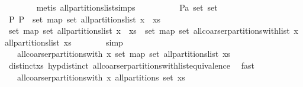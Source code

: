 \begin{isabellebody}
\ \ \ \ \ \ \isamarkupfalse%
\ {\isacharparenleft}metis\ all{\isacharunderscore}partitions{\isacharunderscore}list{\isachardot}simps{\isacharparenleft}{}{\isacharparenright}{\isacharparenright}\isanewline
\ \ \isamarkupfalse%
\ \isanewline
\ \ \ \ \isamarkupfalse%
\ P{\isacharcolon}{\isacharcolon}{\isachardoublequoteopen}{\isacharprime}a\ set\ set{\isachardoublequoteclose}\ \isanewline
\ \ \ \ \isamarkupfalse%
\ P{\isacharcolon}\ {\isachardoublequoteopen}P\ {\isasymin}\ set\ {\isacharparenleft}map\ set\ {\isacharparenleft}all{\isacharunderscore}partitions{\isacharunderscore}list\ {\isacharparenleft}x\ {\isacharhash}\ xs{\isacharparenright}{\isacharparenright}{\isacharparenright}{\isachardoublequoteclose}\isanewline
\isanewline
\ \ \ \ \isamarkupfalse%
\ {\isachardoublequoteopen}set\ {\isacharparenleft}map\ set\ {\isacharparenleft}all{\isacharunderscore}partitions{\isacharunderscore}list\ {\isacharparenleft}x\ {\isacharhash}\ xs{\isacharparenright}{\isacharparenright}{\isacharparenright}\ {\isacharequal}\ set\ {\isacharparenleft}map\ set\ {\isacharparenleft}all{\isacharunderscore}coarser{\isacharunderscore}partitions{\isacharunderscore}with{\isacharunderscore}list\ x\ {\isacharparenleft}all{\isacharunderscore}partitions{\isacharunderscore}list\ xs{\isacharparenright}{\isacharparenright}{\isacharparenright}{\isachardoublequoteclose}\isanewline
\ \ \ \ \ \ \isamarkupfalse%
\ simp\isanewline
\ \ \ \ \isamarkupfalse%
\ \isamarkupfalse%
\ {\isachardoublequoteopen}{\isasymdots}\ {\isacharequal}\ all{\isacharunderscore}coarser{\isacharunderscore}partitions{\isacharunderscore}with\ x\ {\isacharparenleft}set\ {\isacharparenleft}map\ set\ {\isacharparenleft}all{\isacharunderscore}partitions{\isacharunderscore}list\ xs{\isacharparenright}{\isacharparenright}{\isacharparenright}{\isachardoublequoteclose}\isanewline
\ \ \ \ \ \ \isamarkupfalse%
\ distinct{\isacharunderscore}xs\ hyp{\isacharunderscore}distinct\ all{\isacharunderscore}coarser{\isacharunderscore}partitions{\isacharunderscore}with{\isacharunderscore}list{\isacharunderscore}equivalence\ \isamarkupfalse%
\ fast\isanewline
\ \ \ \ \isamarkupfalse%
\ \isamarkupfalse%
\ {\isachardoublequoteopen}{\isasymdots}\ {\isacharequal}\ all{\isacharunderscore}coarser{\isacharunderscore}partitions{\isacharunderscore}with\ x\ {\isacharparenleft}all{\isacharunderscore}partitions\ {\isacharparenleft}set\ xs{\isacharparenright}{\isacharparenright}{\isachardoublequoteclose}\isanewline

\end{isabellebody}
